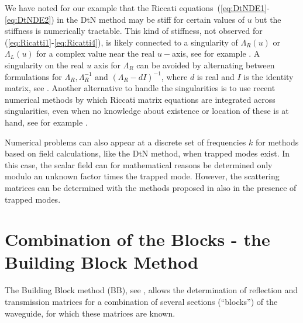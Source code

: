 \documentclass[numreferences]{kluwer}
\renewcommand{\Lambda}{\varLambda}
\renewcommand{\Lambda}{\varLambda}
\begin{document}
We have noted for our example that the Riccati
equations~(\ref{eq:DtNDE1}-\ref{eq:DtNDE2}) in the DtN method may be
stiff for certain values of $u$ but the stiffness is numerically
tractable. This kind of stiffness, not observed for
(\ref{eq:Ricatti1}-\ref{eq:Ricatti4}), is likely connected to a
singularity of $\Lambda_R(u)$ or $\Lambda_L(u)$ for a complex value
near the real $u-$axis, see for example \cite{Fishman:1998}. A
singularity on the real $u$ axis for $\Lambda_R$ can be avoided by
alternating between formulations for $\Lambda_R,\Lambda_R^{-1}$ and
$(\Lambda_R-dI)^{-1}$, where $d$ is real and $I$ is the identity
matrix, see \cite{lu+mclaughlin:2000}. Another alternative to handle
the singularities is to use recent numerical methods by which Riccati
matrix equations are integrated across singularities, even when no
knowledge about existence or location of these is at hand, see for
example \cite{Li-Kahan:2012}.

Numerical problems can also appear at a discrete set of frequencies
$k$ for methods based on field calculations, like the DtN method, when
trapped modes exist. In this case, the scalar field can for
mathematical reasons be determined only modulo an unknown factor times
the trapped mode. However, the scattering matrices can be determined
with the methods proposed in \cite{Nilsson:2002} also in the presence
of trapped modes.




\section{Combination of the Blocks - the Building
 Block Method}
\label{sec:comb-blocks-build}

The Building Block method (BB), see \cite{nilssonbrander1981b}, allows
the determination of reflection and transmission matrices for a
combination of several sections (``blocks'') of the waveguide, for
which these matrices are known.
\end{document}
